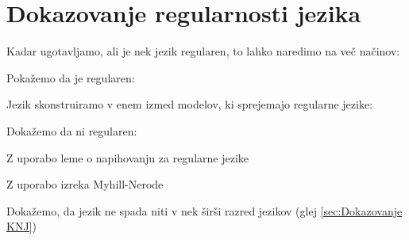 \documentclass[10pt,a4paper,oneside]{book}
\begin{document}
\section{Dokazovanje regularnosti jezika}\label{sec:Dokazovanje RJ}
Kadar ugotavljamo, ali je nek jezik regularen, to lahko naredimo na več načinov:
\begin{items}
\item Pokažemo da je regularen:
	\begin{items}
	\item Jezik skonstruiramo v enem izmed modelov, ki sprejemajo regularne jezike:
		\begin{items}
		\item {}
		\item {}
		\item {}
		\end{items}
	\end{items}
\item Dokažemo da ni regularen:
	\begin{items}
	\item Z uporabo leme o napihovanju za regularne jezike
	\item Z uporabo izreka Myhill-Nerode
	\item Dokažemo, da jezik ne spada niti v nek širši razred jezikov (glej \ref{sec:Dokazovanje KNJ})
	\end{items}
\end{items}

\end{document}
